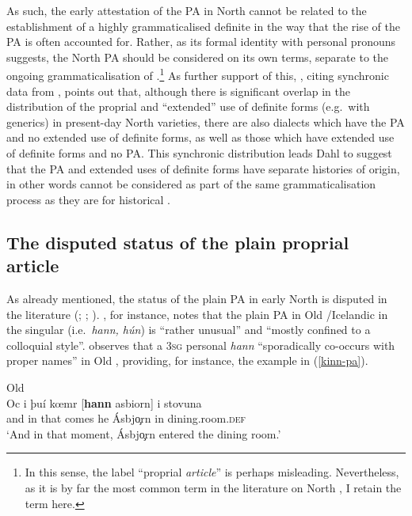 \documentclass[output=paper,colorlinks,citecolor=brown]{langscibook}
\begin{document}
As such, the early attestation of the PA in North  cannot be related to the establishment of a highly grammaticalised definite  in the way that the rise of the  PA is often accounted for. Rather, as its formal
identity with personal pronouns suggests, the North  PA should be considered on its own terms, separate to the ongoing grammaticalisation of .\footnote{In this sense, the label ``proprial \textit{article}'' is perhaps misleading. Nevertheless, as it is by far the most common term in the literature on North , I retain the term here.} As further support of this, \citet[98]{dahl2015grammaticalization}, citing synchronic data from \citet{delsing1993internal}, points out that, although there is significant overlap in the distribution of the proprial  and ``extended'' use of definite forms (e.g.~with generics) in present-day North  varieties, there are also dialects which have the PA and no extended use of definite forms, %
as well as those which have extended use of definite forms and no PA. %
This synchronic distribution leads Dahl to suggest that the PA and extended uses of definite forms have separate histories of origin, in other words cannot be considered as part of the same grammaticalisation process as they are for historical .


\subsection{The disputed status of the plain proprial article}

As already mentioned, the status of the plain PA in early North  is disputed in the literature (\citealp{Faarlund04}; \citealp{Kinn2016-thesis}; \citealp{Johnsen2016}).
\citet[89]{Faarlund04}, for instance, notes that the plain PA in Old /Icelandic in the singular (i.e.~\textit{hann, hún}) is  ``rather unusual'' and ``mostly confined to a colloquial style''. \citet[165]{Kinn2016-thesis} observes that a \textsc{3sg} personal  \textit{hann} ``sporadically co-occurs with proper names'' in Old , providing, for instance, the example in (\ref{kinn-pa}).

\ea \label{kinn-pa}  Old  \\
\gll Oc i þuí k{\oe}mr [\textbf{hann} asbiorn] i stovuna \\
   and in that comes he Ásbj\c{o}rn in dining.room.\textsc{def} \\
\glt  `And in that moment, Ásbj\c{o}rn entered the dining room.' \citep[165]{Kinn2016-thesis}\\
\z
\end{document}
